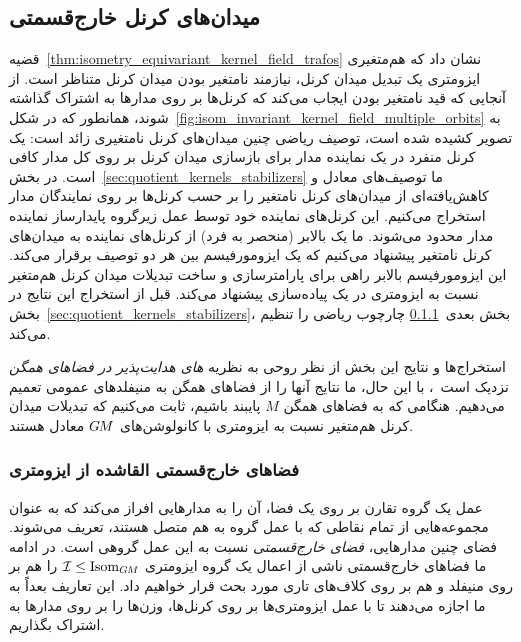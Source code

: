 

\subsection{میدان‌های کرنل خارج‌قسمتی}
\label{sec:quotient_kernel_fields}


قضیه~\ref{thm:isometry_equivariant_kernel_field_trafos} نشان داد که هم‌متغیری ایزومتری یک تبدیل میدان کرنل، نیازمند نامتغیر بودن میدان کرنل متناظر است.
از آنجایی که قید نامتغیر بودن ایجاب می‌کند که کرنل‌ها بر روی مدارها به اشتراک گذاشته شوند، همانطور که در شکل~\ref{fig:isom_invariant_kernel_field_multiple_orbits} به تصویر کشیده شده است، توصیف ریاضی چنین میدان‌های کرنل نامتغیری زائد است:
یک کرنل منفرد در یک نماینده مدار برای بازسازی میدان کرنل بر روی کل مدار کافی است.
در بخش~\ref{sec:quotient_kernels_stabilizers} ما توصیف‌های معادل و کاهش‌یافته‌ای از میدان‌های کرنل نامتغیر را بر حسب کرنل‌ها بر روی نمایندگان مدار استخراج می‌کنیم.
این کرنل‌های نماینده خود توسط عمل زیرگروه پایدارساز نماینده مدار محدود می‌شوند.
ما یک بالابر (منحصر به فرد) از کرنل‌های نماینده به میدان‌های کرنل نامتغیر پیشنهاد می‌کنیم که یک ایزومورفیسم بین هر دو توصیف برقرار می‌کند.
این ایزومورفیسم بالابر راهی برای پارامترسازی و ساخت تبدیلات میدان کرنل هم‌متغیر نسبت به ایزومتری در یک پیاده‌سازی پیشنهاد می‌کند.
قبل از استخراج این نتایج در بخش~\ref{sec:quotient_kernels_stabilizers}، بخش بعدی~\ref{sec:isom_quotients} چارچوب ریاضی را تنظیم می‌کند.

استخراج‌ها و نتایج این بخش از نظر روحی به نظریه \emph{های هدایت‌پذیر در فضاهای همگن} نزدیک است~\cite{Cohen2018-intertwiners,Cohen2019-generaltheory}،
با این حال، ما نتایج آنها را از فضاهای همگن به منیفلدهای عمومی تعمیم می‌دهیم.
هنگامی که به فضاهای همگن $M$ پایبند باشیم، ثابت می‌کنیم که تبدیلات میدان کرنل هم‌متغیر نسبت به ایزومتری با کانولوشن‌های $G\mkern-1.4muM$ معادل هستند.





\subsubsection{فضاهای خارج‌قسمتی القاشده از ایزومتری}
\label{sec:isom_quotients}


عمل یک گروه تقارن بر روی یک فضا، آن را به مدارهایی افراز می‌کند که به عنوان مجموعه‌هایی از تمام نقاطی که با عمل گروه به هم متصل هستند، تعریف می‌شوند.
فضای چنین مدارهایی، \emph{فضای خارج‌قسمتی} نسبت به این عمل گروهی است.
در ادامه ما فضاهای خارج‌قسمتی ناشی از اعمال یک گروه ایزومتری $\mathcal{I} \leq \operatorname{Isom}_{G\mkern-1.4muM}$ را هم بر روی منیفلد و هم بر روی کلاف‌های تاری مورد بحث قرار خواهیم داد.
این تعاریف بعداً به ما اجازه می‌دهند تا با عمل ایزومتری‌ها بر روی کرنل‌ها، وزن‌ها را بر روی مدارها به اشتراک بگذاریم.



